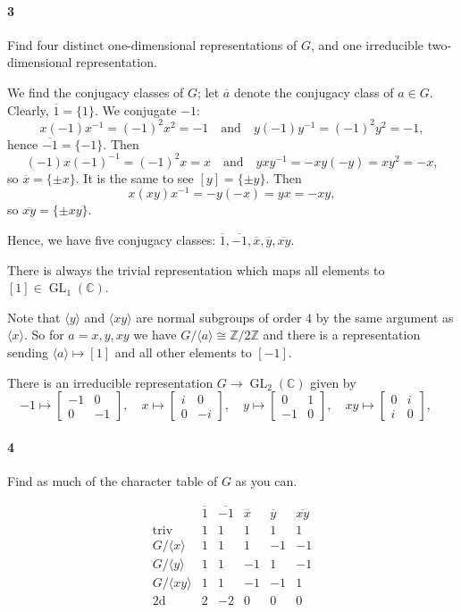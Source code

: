 \documentclass[12pt]{article}
\newlength{\myparskip}
\newenvironment{fullbox}{\begin{lrbox}{\savefullbox}\begin{minipage}{\dimexpr\textwidth-2\fboxsep\relax}\setlength{\parskip}{\myparskip}}{\end{minipage}\end{lrbox}\framebox[\textwidth]{\usebox{\savefullbox}}}
\newenvironment{pbox}[1][]{\begin{fullbox}\ifx#1\empty\else\paragraph{#1}\phantom{}\fi}{\end{fullbox}}
\theoremstyle{definition}
\newcommand{\isp}[1]{\quad\text{#1}\quad}
\newcommand{\Z}{\mathbb{Z}}
\newcommand{\C}{\mathbb{C}}
\newcommand{\<}{\langle}
\renewcommand{\>}{\rangle}
\newcommand{\isom}{\cong}
\newcommand{\eqc}{\overline}
\newcommand{\mat}[1]{\begin{bmatrix}#1\end{bmatrix}}
\DeclareMathOperator{\GL}{GL}
\begin{document}
\newpage
\begin{pbox}[3]
    Find four distinct one-dimensional representations of $G$, and one irreducible two-dimensional representation.
\end{pbox}

We find the conjugacy classes of $G$; let $\eqc{a}$ denote the conjugacy class of $a \in G$.
Clearly, $\eqc{1} = \{1\}$.
We conjugate $-1$:
\[
    x(-1)x^{-1} = (-1)^2x^2 = -1 \isp{and} y(-1)y^{-1} = (-1)^2y^2 = -1,
\]
hence $\eqc{-1} = \{-1\}$.
Then
\[
    (-1)x(-1)^{-1} = (-1)^2x = x \isp{and} yxy^{-1} = -xy(-y) = xy^2 = -x,
\]
so $\eqc{x} = \{\pm x\}$.
It is the same to see $[y] = \{\pm y\}$.
Then
\[
    x(xy)x^{-1} = -y(-x) = yx = -xy,
\]
so $\eqc{xy} = \{\pm xy\}$.

Hence, we have five conjugacy classes: $\eqc{1}, \eqc{-1}, \eqc{x}, \eqc{y}, \eqc{xy}$.

There is always the trivial representation which maps all elements to $[1] \in \GL_1(\C)$.

Note that $\<y\>$ and $\<xy\>$ are normal subgroups of order $4$ by the same argument as $\<x\>$.
So for $a = x, y, xy$ we have $G/\<a\> \isom \Z/2\Z$ and there is a representation sending $\<a\> \mapsto [1]$ and all other elements to $[-1]$.

There is an irreducible representation $G \to \GL_2(\C)$ given by
\[
    -1 \mapsto \mat{-1 & 0 \\ 0 & -1}, \quad
    x \mapsto \mat{i & 0 \\ 0 & -i}, \quad
    y \mapsto \mat{0 & 1 \\ -1 & 0}, \quad
    xy \mapsto \mat{0 & i \\ i & 0}, \quad
\]


\begin{pbox}[4]
    Find as much of the character table of $G$ as you can.
\end{pbox}
\[
    \begin{array}{r|rrrrr}
        & \eqc{1} & \eqc{-1} & \eqc{x} & \eqc{y} & \eqc{xy} \\
        \hline
        \text{triv} & 1 & 1 & 1 & 1 & 1 \\
        G/\<x\> & 1 & 1 & 1 & -1 & -1 \\
        G/\<y\> & 1 & 1 & -1 & 1 & -1 \\
        G/\<xy\> & 1 & 1 & -1 & -1 & 1 \\
        \text{2d} & 2 & -2 & 0 & 0 & 0
    \end{array}    
\]
\end{document}
